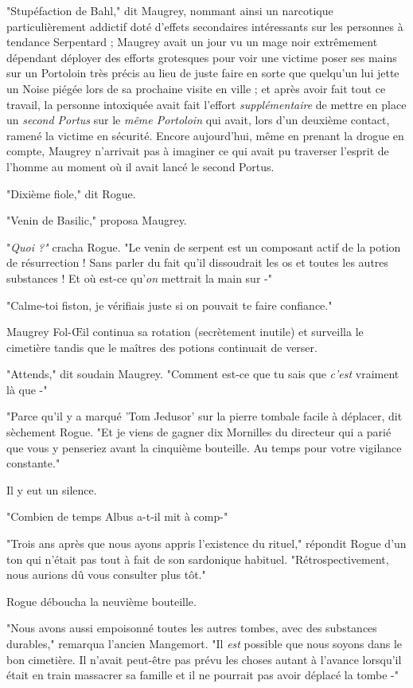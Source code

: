 "Stupéfaction de Bahl," dit Maugrey, nommant ainsi un narcotique particulièrement addictif doté d'effets secondaires intéressants sur les personnes à tendance Serpentard ; Maugrey avait un jour vu un mage noir extrêmement dépendant déployer des efforts grotesques pour voir une victime poser ses mains sur un Portoloin très précis au lieu de juste faire en sorte que quelqu'un lui jette un Noise piégée lors de sa prochaine visite en ville ; et après avoir fait tout ce travail, la personne intoxiquée avait fait l'effort \emph{supplémentaire}  de mettre en place un \emph{second Portus}  sur le \emph{même Portoloin}  qui avait, lors d'un deuxième contact, ramené la victime en sécurité. Encore aujourd'hui, même en prenant la drogue en compte, Maugrey n'arrivait pas à imaginer ce qui avait pu traverser l'esprit de l'homme au moment où il avait lancé le second Portus.

"Dixième fiole," dit Rogue.

"Venin de Basilic," proposa Maugrey.

"\emph{Quoi ?"}  cracha Rogue. "Le venin de serpent est un composant actif de la potion de résurrection ! Sans parler du fait qu'il dissoudrait les os et toutes les autres substances ! Et où est-ce qu'\emph{on}  mettrait la main sur -"

"Calme-toi fiston, je vérifiais juste si on pouvait te faire confiance."

Maugrey Fol-Œil continua sa rotation (secrètement inutile) et surveilla le cimetière tandis que le maîtres des potions continuait de verser.

"Attends," dit soudain Maugrey. "Comment est-ce que tu sais que \emph{c'est}  vraiment là que -"

"Parce qu'il y a marqué 'Tom Jedusor' sur la pierre tombale facile à déplacer, dit sèchement Rogue. "Et je viens de gagner dix Mornilles du directeur qui a parié que vous y penseriez avant la cinquième bouteille. Au temps pour votre vigilance constante."

Il y eut un silence.

"Combien de temps Albus a-t-il mit à comp-"

"Trois ans après que nous ayons appris l'existence du rituel," répondit Rogue d'un ton qui n'était pas tout à fait de son sardonique habituel. "Rétrospectivement, nous aurions dû vous consulter plus tôt."

Rogue déboucha la neuvième bouteille.

"Nous avons aussi empoisonné toutes les autres tombes, avec des substances durables," remarqua l'ancien Mangemort. "Il \emph{est}  possible que nous soyons dans le bon cimetière. Il n'avait peut-être pas prévu les choses autant à l'avance lorsqu'il était en train massacrer sa famille et il ne pourrait pas avoir déplacé la tombe -"

